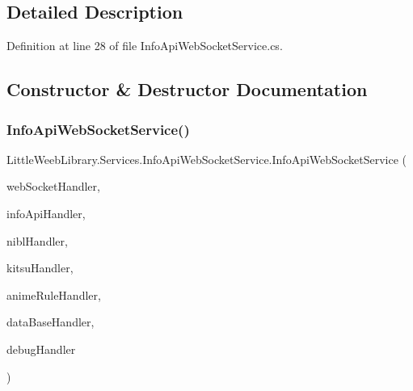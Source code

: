 \subsection{Detailed Description}


Definition at line 28 of file Info\+Api\+Web\+Socket\+Service.\+cs.



\subsection{Constructor \& Destructor Documentation}
\mbox{\label{class_little_weeb_library_1_1_services_1_1_info_api_web_socket_service_accba84b6333a0472f3acae2469ce5da3}} 
\subsubsection{\texorpdfstring{Info\+Api\+Web\+Socket\+Service()}{InfoApiWebSocketService()}}
{\footnotesize\ttfamily Little\+Weeb\+Library.\+Services.\+Info\+Api\+Web\+Socket\+Service.\+Info\+Api\+Web\+Socket\+Service (\begin{DoxyParamCaption}\item[{\mbox{\hyperlink{interface_little_weeb_library_1_1_handlers_1_1_i_web_socket_handler}{I\+Web\+Socket\+Handler}}}]{web\+Socket\+Handler,  }\item[{\mbox{\hyperlink{interface_little_weeb_library_1_1_handlers_1_1_i_anime_profile_handler}{I\+Anime\+Profile\+Handler}}}]{info\+Api\+Handler,  }\item[{\mbox{\hyperlink{interface_little_weeb_library_1_1_handlers_1_1_i_nibl_handler}{I\+Nibl\+Handler}}}]{nibl\+Handler,  }\item[{\mbox{\hyperlink{interface_little_weeb_library_1_1_handlers_1_1_i_kitsu_handler}{I\+Kitsu\+Handler}}}]{kitsu\+Handler,  }\item[{\mbox{\hyperlink{interface_little_weeb_library_1_1_handlers_1_1_i_anime_rule_handler}{I\+Anime\+Rule\+Handler}}}]{anime\+Rule\+Handler,  }\item[{\mbox{\hyperlink{interface_little_weeb_library_1_1_handlers_1_1_i_data_base_handler}{I\+Data\+Base\+Handler}}}]{data\+Base\+Handler,  }\item[{\mbox{\hyperlink{interface_little_weeb_library_1_1_handlers_1_1_i_debug_handler}{I\+Debug\+Handler}}}]{debug\+Handler }\end{DoxyParamCaption})}



